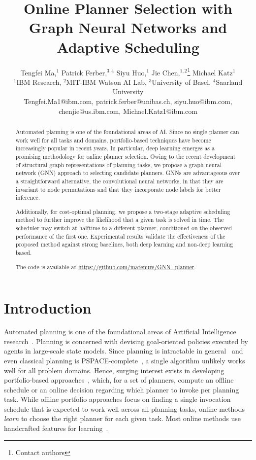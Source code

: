 \documentclass[letterpaper]{article} %
\title{Online Planner Selection with Graph Neural Networks and Adaptive Scheduling}
\author{
 Tengfei Ma,$^1$
 Patrick Ferber,$^{3,4}$
 Siyu Huo,$^1$
 Jie Chen,$^{1,2}$\thanks{Contact authors}
 Michael Katz$^1$\footnotemark[1]\\
 $^1$IBM Research,
 $^2$MIT-IBM Watson AI Lab,
 $^3$University of Basel,
 $^4$Saarland University\\
 Tengfei.Ma1@ibm.com,
 patrick.ferber@unibas.ch,
 siyu.huo@ibm.com,
 chenjie@us.ibm.com,
 Michael.Katz1@ibm.com
}
\begin{document}
\maketitle


\begin{abstract}
Automated planning is one of the foundational areas of AI. Since no
single planner can work well for all tasks and domains,
portfolio-based techniques have become increasingly popular in recent
years. In particular, deep learning emerges as a promising methodology
for online planner selection. Owing to the recent development of
structural graph representations of planning tasks, we propose a graph
neural network (GNN) approach to selecting candidate planners.  GNNs
are advantageous over a straightforward alternative, the convolutional
neural networks, in that they are invariant to node permutations and
that they incorporate node labels for better inference.

Additionally, for cost-optimal planning, we propose a two-stage
adaptive scheduling method to further improve the likelihood that a
given task is solved in time. The scheduler may switch at halftime to
a different planner, conditioned on the observed performance of the
first one. Experimental results validate the effectiveness of the
proposed method against strong baselines, both deep learning and
non-deep learning based.

The code is available at \url{https://github.com/matenure/GNN_planner}.
\end{abstract}


\section{Introduction}

Automated planning is one of the foundational areas of Artificial
Intelligence research~\cite{russell-norvig-1995}. 
Planning is
concerned with devising goal-oriented policies executed by agents in
large-scale state models.  Since planning is intractable in
general~\cite{chapman-aij1987}
and even classical planning is
PSPACE-complete~\cite{bylander-aij1994},
a single algorithm unlikely
works well for all problem domains.  Hence, surging interest exists in
developing portfolio-based
approaches~\cite{seipp-et-al-icaps2012,vallati-miwai2012,howe-et-al-ecp1999,seipp-et-al-aaai2015},
which, for a set of planners, compute an offline schedule or an online
decision regarding which planner to invoke per planning task.  While
offline portfolio approaches focus on finding a single invocation
schedule that is expected to work well across all planning tasks,
online methods {\em learn} to choose the right planner for each given
task.  Most online methods use handcrafted features for
learning~\cite{cenamor-et-al-jair2016}.
\end{document}

